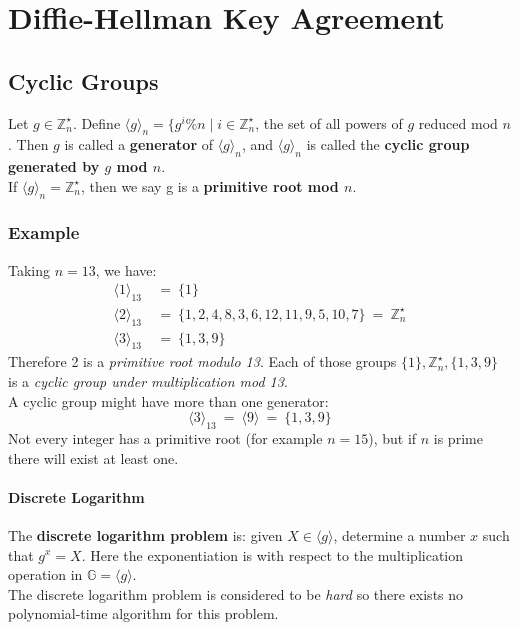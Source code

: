 \documentclass{article}
\begin{document}
		\section{Diffie-Hellman Key Agreement}
		\begin{adjustwidth}{2em}{2em}
			\subsection{Cyclic Groups}
			\begin{adjustwidth}{2em}{2em}
				Let $g \in \mathbb{Z}_n^{\star}$. Define $\langle g \rangle_n = \{ g^{i} \% n \mid i \in \mathbb{Z}_n^{\star}$, the set of all powers of $g$ reduced mod $n$. Then $g$ is called a \textbf{generator} of $\langle g \rangle_n$, and $\langle g \rangle_n$ is called the \textbf{cyclic group generated by $g$ mod $n$}. \\
				 If $\langle g \rangle_n = \mathbb{Z}_n^{\star}$, then we say g is a \textbf{primitive root mod $n$}.
				 \subsubsection{Example}
				 \begin{adjustwidth}{2em}{1em}
				 	Taking $n = 13$, we have:
				 	\begin{align*}
				 		\langle 1 \rangle _{13} \ & = \ \{ 1 \} \\
				 		\langle 2 \rangle _{13} \ & = \ \{ 1,2,4,8,3,6,12,11,9,5,10,7 \} \ = \ \mathbb{Z}_n^{\star} \\
				 		\langle 3 \rangle _{13} \ & = \ \{ 1,3,9 \}
				 	\end{align*}
				 	Therefore 2 is a \textit{primitive root modulo 13}. Each of those groups $\{ 1 \}, \mathbb{Z}_n^{\star}, \{ 1,3,9 \}$ is a \textit{cyclic group under multiplication mod 13}. \\
				 	A cyclic group might have more than one generator:
				 	\[
				 		\langle 3 \rangle_{13} \ = \ \langle 9 \rangle \ = \ \{ 1,3,9 \}
				 	\]
				 	Not every integer has a primitive root (for example $n = 15$), but if $n$ is prime there will exist at least one.
				 	\paragraph{Discrete Logarithm}
				 		\begin{adjustwidth}{2em}{}
				 			The \textbf{discrete logarithm problem} is: given $X \in \langle g \rangle$, determine a number $x$ such that $g^x = X$. Here the exponentiation is with respect to the multiplication operation in $\mathbb{G} = \langle g \rangle$. \\
				 			The discrete logarithm problem is considered to be \textit{hard} so there exists no polynomial-time algorithm for this problem.
				 		\end{adjustwidth}
				 \end{adjustwidth}
			\end{adjustwidth}

\end{adjustwidth}
\end{document}
